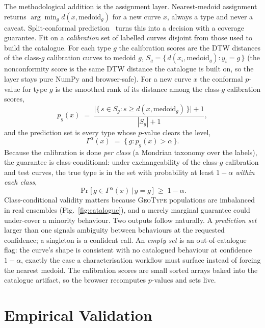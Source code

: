 \documentclass[journal]{IEEEtran}
\newcommand{\gt}{\textsc{GeoType}}
\begin{document}
The methodological addition is the assignment layer. Nearest-medoid assignment returns $\arg\min_g
d(x,\text{medoid}_g)$ for a new curve $x$, always a type and never a caveat. Split-conformal
prediction~\cite{vovk,angelopoulos} turns this into a decision with a coverage guarantee. Fit on a \emph{calibration} set of
labelled curves disjoint from those used to build the catalogue. For each type $g$ the calibration scores are the
DTW distances of the class-$g$ calibration curves to medoid $g$, $S_g=\{\,d(x_i,\text{medoid}_g): y_i=g\,\}$
(the nonconformity score is the same DTW distance the catalogue is built on, so the layer stays pure NumPy and
browser-safe). For a new curve $x$ the conformal $p$-value for type $g$ is the smoothed rank of its distance
among the class-$g$ calibration scores,
\begin{equation}
p_g(x) \;=\; \frac{\bigl|\{\,s\in S_g : s \ge d(x,\text{medoid}_g)\,\}\bigr| + 1}{|S_g| + 1},
\end{equation}
and the prediction set is every type whose $p$-value clears the level,
\begin{equation}
\Gamma^{\alpha}(x) \;=\; \{\, g : p_g(x) > \alpha \,\}.
\end{equation}
Because the calibration is done \emph{per class} (a Mondrian taxonomy over the labels), the guarantee is
class-conditional: under exchangeability of the class-$g$ calibration and test curves, the true type is in the
set with probability at least $1-\alpha$ \emph{within each class},
\begin{equation}
\Pr\bigl[\, g \in \Gamma^{\alpha}(x) \,\big|\, y=g \,\bigr] \;\ge\; 1-\alpha .
\end{equation}
Class-conditional validity matters because \gt{} populations are imbalanced in real ensembles
(Fig.~\ref{fig:catalogue}), and a merely marginal guarantee could under-cover a minority behaviour. Two outputs
follow naturally. A \emph{prediction set} larger than one signals ambiguity between behaviours at the
requested confidence; a singleton is a confident call. An \emph{empty set} is an out-of-catalogue flag:
the curve's shape is consistent with no catalogued behaviour at confidence $1-\alpha$, exactly the case a
characterisation workflow must surface instead of forcing the nearest medoid. The calibration scores are small
sorted arrays baked into the catalogue artifact, so the browser recomputes $p$-values and sets live.

\section{Empirical Validation}\label{sec:validation}
\end{document}
